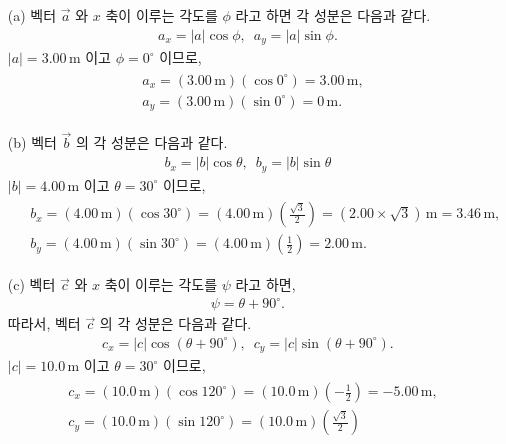\documentclass[floatfix,nofootinbib,superscriptaddress,fleqn,preprint]{revtex4}
\begin{document}
\begin{itemize}
  \item[(a)] 벡터 $\vec{a}$ 와 $x$ 축이 이루는 각도를 $\phi$ 라고 하면 각 성분은 다음과 같다.
  \begin{align}
    a_x = |a|\cos{\phi},\,\,\,a_y = |a|\sin{\phi}.
  \end{align}
  $|a|=3.00\,\mathrm{m}$ 이고 $\phi = 0^\circ$ 이므로,
  \begin{align}
    \begin{split}
    &a_x = (3.00\,\mathrm{m})(\cos{0^\circ}) =3.00\,\mathrm{m},   \\
    &a_y = (3.00\,\mathrm{m})(\sin{0^\circ})=0\,\mathrm{m}.
    \end{split}
  \end{align}
  \item[(b)] 벡터 $\vec{b}$ 의 각 성분은 다음과 같다.
  \begin{align}
    b_x = |b|\cos{\theta},\,\,\,b_y = |b|\sin{\theta}
  \end{align}
  $|b|=4.00\,\mathrm{m}$ 이고 $\theta = 30^\circ$ 이므로,
  \begin{align}
    \begin{split}
      &b_x = (4.00\,\mathrm{m})(\cos{30^\circ}) 
      =(4.00\,\mathrm{m})\left(\frac{\sqrt{3}}{2}\right)
      =(2.00\times\sqrt{3})\,\mathrm{m} =3.46\,\mathrm{m},  \\
      &b_y = (4.00\,\mathrm{m})(\sin{30^\circ})
      =(4.00\,\mathrm{m})\left(\frac{1}{2}\right)
      =2.00\,\mathrm{m}.
    \end{split}
  \end{align}
  \item[(c)] 벡터 $\vec{c}$ 와 $x$ 축이 이루는 각도를 $\psi$ 라고 하면,
  \begin{align}
    \psi = \theta + 90^{\circ}.
  \end{align}
  따라서, 벡터 $\vec{c}$ 의 각 성분은 다음과 같다.
  \begin{align}
    c_x = |c|\cos{(\theta + 90^{\circ})},\,\,\,c_y = |c|\sin{(\theta + 90^{\circ})}.
  \end{align}
  $|c|=10.0\,\mathrm{m}$ 이고 $\theta = 30^\circ$ 이므로,
  \begin{align}
    \begin{split}
      &c_x = (10.0\,\mathrm{m})(\cos{120^\circ}) 
      =(10.0\,\mathrm{m})\left(-\frac{1}{2}\right)
      =-5.00\,\mathrm{m},  \\
      &c_y = (10.0\,\mathrm{m})(\sin{120^\circ})
      =(10.0\,\mathrm{m})\left(\frac{\sqrt{3}}{2}\right)

\end{split}
\end{align}
\end{itemize}
\end{document}
